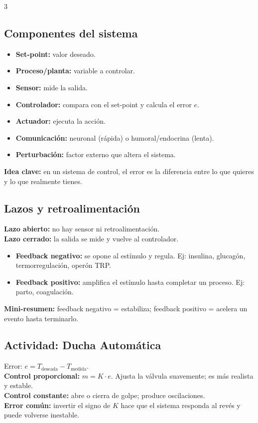 \documentclass[9pt,landscape,letterpaper]{extarticle}
\begin{document}
\begin{multicols*}{3}
	\subsection{Componentes del sistema}
	\begin{itemize}
		\item \textbf{Set-point:} valor deseado.
		\item \textbf{Proceso/planta:} variable a controlar.
		\item \textbf{Sensor:} mide la salida.
		\item \textbf{Controlador:} compara con el set-point y calcula el error $e$.
		\item \textbf{Actuador:} ejecuta la acción.
		\item \textbf{Comunicación:} neuronal (rápida) o humoral/endocrina (lenta).
		\item \textbf{Perturbación:} factor externo que altera el sistema.
	\end{itemize}
	\textbf{Idea clave:} en un sistema de control, el error es la diferencia entre lo que quieres y lo que realmente tienes.

	\subsection{Lazos y retroalimentación}
	\textbf{Lazo abierto:} no hay sensor ni retroalimentación.\\
	\textbf{Lazo cerrado:} la salida se mide y vuelve al controlador.\\
	\begin{itemize}
		\item \textbf{Feedback negativo:} se opone al estímulo y regula. Ej: insulina, glucagón, termorregulación, operón TRP.
		\item \textbf{Feedback positivo:} amplifica el estímulo hasta completar un proceso. Ej: parto, coagulación.
	\end{itemize}
	\textbf{Mini-resumen:} feedback negativo = estabiliza; feedback positivo = acelera un evento hasta terminarlo.

	\subsection{Actividad: Ducha Automática}
	Error: $e = T_{\text{deseada}} - T_{\text{medida}}$.\\
	\textbf{Control proporcional:} $m = K \cdot e$. Ajusta la válvula suavemente; es más realista y estable.\\
	\textbf{Control constante:} abre o cierra de golpe; produce oscilaciones.\\
	\textbf{Error común:} invertir el signo de $K$ hace que el sistema responda al revés y puede volverse inestable.


\end{multicols*}
\end{document}
